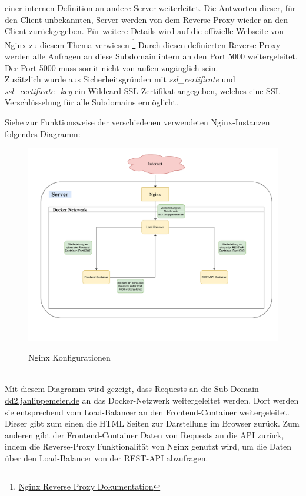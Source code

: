 einer internen Definition an andere Server weiterleitet. Die Antworten dieser, für den Client unbekannten, Server
werden von dem Reverse-Proxy wieder an den Client zurückgegeben. Für weitere Details wird auf die offizielle Webseite von 
Nginx zu diesem Thema verwiesen \footnote{\href{https://docs.nginx.com/nginx/admin-guide/web-server/reverse-proxy/}{Nginx Reverse Proxy Dokumentation}}
Durch diesen definierten Reverse-Proxy werden alle Anfragen an diese Subdomain intern an den Port 5000 weitergeleitet. 
Der Port 5000 muss somit nicht von außen zugänglich sein.\\
Zusätzlich wurde aus Sicherheitsgründen mit \textit{ssl\_certificate} und \textit{ssl\_certificate\_key} ein Wildcard SSL Zertifikat 
angegeben, welches eine SSL-Verschlüsselung für alle Subdomains ermöglicht.

Siehe zur Funktionsweise der verschiedenen verwendeten Nginx-Instanzen folgendes Diagramm: 

\begin{figure}[H]
    \centering
    \includegraphics[width=\linewidth]{figures/NginxOverview.pdf}
    \label{fig:server}
    \caption{Nginx Konfigurationen}
\end{figure}~\\
Mit diesem Diagramm wird gezeigt, dass Requests an die Sub-Domain \href{https://dd2.janlippemeier.de}{dd2.janlippemeier.de} 
an das Docker-Netzwerk \cite{docker-network} weitergeleitet werden. Dort werden sie entsprechend vom Load-Balancer 
an den Frontend-Container weitergeleitet. Dieser gibt zum einen die HTML Seiten zur Darstellung im Browser zurück.
Zum anderen gibt der Frontend-Container Daten von Requests an die API zurück, indem die Reverse-Proxy Funktionalität 
von Nginx genutzt wird, um die Daten über den Load-Balancer von der REST-API abzufragen.

